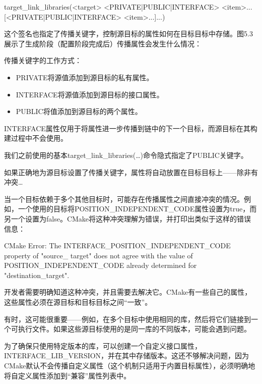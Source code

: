 \begin{shell}
target_link_libraries(<target>
                    <PRIVATE|PUBLIC|INTERFACE> <item>...
                    [<PRIVATE|PUBLIC|INTERFACE> <item>...]...)
\end{shell}

这个签名也指定了传播关键字，控制源目标的属性如何在目标目标中存储。图5.3展示了生成阶段（配置阶段完成后）传播属性会发生什么情况：


传播关键字的工作方式：

\begin{itemize}
\item
PRIVATE将源值添加到源目标的私有属性。

\item
INTERFACE将源值添加到源目标的接口属性。

\item
PUBLIC将值添加到源目标的两个属性。
\end{itemize}

INTERFACE属性仅用于将属性进一步传播到链中的下一个目标，而源目标在其构建过程中不会使用。

我们之前使用的基本target\_link\_libraries(…)命令隐式指定了PUBLIC关键字。

如果正确地为源目标设置了传播关键字，属性将自动放置在目标目标上——除非有冲突…


当一个目标依赖于多个其他目标时，可能存在传播属性之间直接冲突的情况。例如，一个使用的目标将POSITION\_INDEPENDENT\_CODE属性设置为true，而另一个设置为false。CMake将这种冲突理解为错误，并打印出类似于这样的错误信息：

\begin{shell}
CMake Error: The INTERFACE_POSITION_INDEPENDENT_CODE property of "source_ target" does not agree with the value of POSITION_INDEPENDENT_CODE already determined for "destination_target".
\end{shell}

开发者需要明确知道这种冲突，并且需要去解决它。CMake有一些自己的属性，这些属性必须在源目标和目标目标之间“一致”。

有时，这可能很重要——例如，在多个目标中使用相同的库，然后将它们链接到一个可执行文件。如果这些源目标使用的是同一库的不同版本，可能会遇到问题。

为了确保只使用特定版本的库，可以创建一个自定义接口属性，INTERFACE\_LIB\_VERSION，并在其中存储版本。这还不够解决问题，因为CMake默认不会传播自定义属性（这个机制只适用于内置目标属性），必须明确地将自定义属性添加到“兼容”属性列表中。

